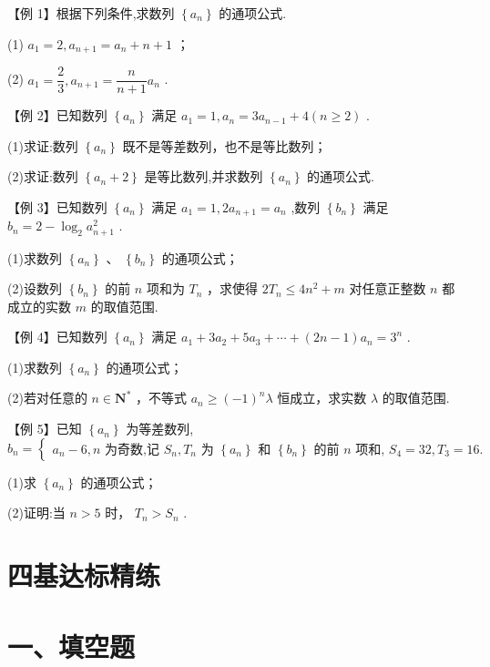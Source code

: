 【例 1】根据下列条件,求数列 $\left\{  {a}_{n}\right\}$ 的通项公式.

(1) ${a}_{1} = 2,{a}_{n + 1} = {a}_{n} + n + 1$ ；

(2) ${a}_{1} = \dfrac{2}{3},{a}_{n + 1} = \dfrac{n}{n + 1}{a}_{n}$ .

【例 2】已知数列 $\left\{  {a}_{n}\right\}$ 满足 ${a}_{1} = 1,{a}_{n} = 3{a}_{n - 1} + 4\left( {n \geq  2}\right)$ .

(1)求证:数列 $\left\{  {a}_{n}\right\}$ 既不是等差数列，也不是等比数列；

(2)求证:数列 $\left\{  {{a}_{n} + 2}\right\}$ 是等比数列,并求数列 $\left\{  {a}_{n}\right\}$ 的通项公式.

【例 3】已知数列 $\left\{  {a}_{n}\right\}$ 满足 ${a}_{1} = 1,2{a}_{n + 1} = {a}_{n}$ ,数列 $\left\{  {b}_{n}\right\}$ 满足 ${b}_{n} = 2 - {\log }_{2}{a}_{n + 1}^{2}$ .

(1)求数列 $\left\{  {a}_{n}\right\}$ 、 $\left\{  {b}_{n}\right\}$ 的通项公式；

(2)设数列 $\left\{  {b}_{n}\right\}$ 的前 $n$ 项和为 ${T}_{n}$ ，求使得 $2{T}_{n} \leq  4{n}^{2} + m$ 对任意正整数 $n$ 都成立的实数 $m$ 的取值范围.

【例 4】已知数列 $\left\{  {a}_{n}\right\}$ 满足 ${a}_{1} + 3{a}_{2} + 5{a}_{3} + \cdots  + \left( {{2n} - 1}\right) {a}_{n} = {3}^{n}$ .

(1)求数列 $\left\{  {a}_{n}\right\}$ 的通项公式；

(2)若对任意的 $n \in  {\mathbf{N}}^{ * }$ ，不等式 ${a}_{n} \geq  {\left( -1\right) }^{n}\lambda$ 恒成立，求实数 $\lambda$ 的取值范围.

【例 5】已知 $\left\{  {a}_{n}\right\}$ 为等差数列, ${b}_{n} = \left\{  \begin{array}{l} {a}_{n} - 6,n\text{ 为奇数,记 }{S}_{n},{T}_{n}\text{ 为 }\left\{  {a}_{n}\right\}  \text{ 和 }\left\{  {b}_{n}\right\}  \text{ 的前 }n\text{ 项和, }{S}_{4} = {32},{T}_{3} = {16}. \end{array}\right.$

(1)求 $\left\{  {a}_{n}\right\}$ 的通项公式；

(2)证明:当 $n > 5$ 时， ${T}_{n} > {S}_{n}$ .

\section*{四基达标精练}

\section*{一、填空题}

